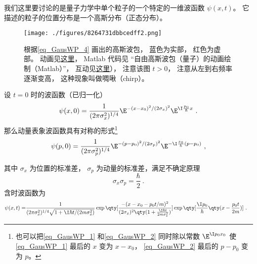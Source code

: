 
\begin{issues}
\issueAbstract
\issueTODO
\end{issues}



我们这里要讨论的是量子力学中单个粒子的一个特定的一维波函数 $\psi(x,t)$。 它描述的粒子的位置分布是一个高斯分布（正态分布）。

\begin{figure}[ht]
\centering
\texttt{[image: ./figures/8264731dbbcedff2.png]}
\caption{根据\autoref{eq_GausWP_4} 画出的高斯波包， 蓝色为实部， 红色为虚部。 动画见\href{https://wuli.wiki/apps/free_gauss.html}{这里}， Matlab 代码见 “自由高斯波包（量子）的动画绘制（Matlab）”， 互动见\href{https://wuli.wiki/apps/gausWP.html}{这里}）， 注意该图 $t > 0$， 注意从左到右频率逐渐变高， 这种现象叫做啁啾（chirp）。} \label{fig_GausWP_1}
\end{figure}


设 $t = 0$ 时的波函数（已归一化）
\begin{equation}\label{eq_GausWP_1}
\psi (x,0) = \frac{1}{(2\pi\sigma_x ^2)^{1/4}} \E^{-(x - x_0)^2/(2\sigma_x)^2} \E^{\I \frac{p_0}{\hbar}x}~.
\end{equation}
那么动量表象波函数具有对称的形式\footnote{也可以把\autoref{eq_GausWP_1} 和\autoref{eq_GausWP_2} 同时除以常数 $\E^{\I p_0 x_0}$ 使\autoref{eq_GausWP_1} 最后的 $x$ 变为 $x-x_0$， \autoref{eq_GausWP_2} 最后的 $p-p_0$ 变为 $p$。 }%
\begin{equation}\label{eq_GausWP_2} %
\psi (p,0) = \frac{1}{(2\pi\sigma_p^2)^{1/4}} \E^{-(p - p_0)^2/(2\sigma_p)^2} \E^{-\I\frac{x_0}{\hbar }(p - p_0)}~,
\end{equation}

其中 $\sigma_x$ 为位置的标准差， $\sigma_p$ 为动量的标准差，满足不确定原理
\begin{equation} %
\sigma_x\sigma_p = \frac{\hbar}{2}~.
\end{equation}
含时波函数为
\begin{equation}\label{eq_GausWP_4}\begin{aligned} %
\psi (x,t) = &\frac{1}{(2\pi\sigma_x^2)^{1/4} \sqrt{1 + {\I\hbar t}/(2m \sigma_x^2)}}
\exp\qty[\frac{-(x - x_0 - p_0 t/m)^2}{(2\sigma_x )^2 \qty(1 + \frac{\I\hbar t}{2m \sigma_x^2})}] \exp\qty[\frac{\I p_0}{\hbar } \qty(x - \frac{p_0 t}{2m})]~.
\end{aligned}\end{equation}

